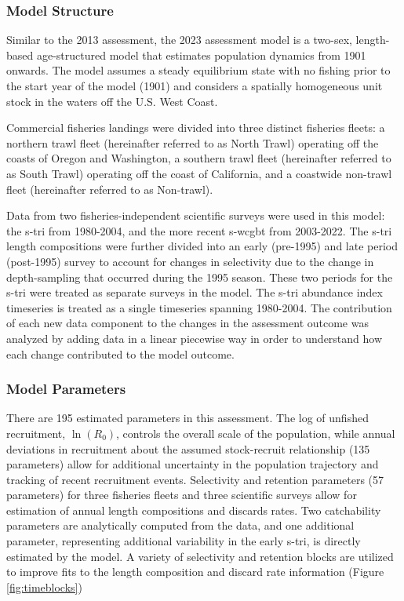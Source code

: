 \documentclass[11pt,
  english,
  letterpaper,
]{article}
\begin{document}
\hypertarget{model-structure}{%
\subsubsection{Model Structure}\label{model-structure}}

Similar to the 2013 assessment, the 2023 assessment model is a two-sex, length-based age-structured model that estimates population dynamics from 1901 onwards. The model assumes a steady equilibrium state with no fishing prior to the start year of the model (1901) and considers a spatially homogeneous unit stock in the waters off the U.S. West Coast.

Commercial fisheries landings were divided into three distinct fisheries fleets: a northern trawl fleet (hereinafter referred to as North Trawl) operating off the coasts of Oregon and Washington, a southern trawl fleet (hereinafter referred to as South Trawl) operating off the coast of California, and a coastwide non-trawl fleet (hereinafter referred to as Non-trawl).

Data from two fisheries-independent scientific surveys were used in this model: the \gls{s-tri} from 1980-2004, and the more recent \gls{s-wcgbt} from 2003-2022. The \gls{s-tri} length compositions were further divided into an early (pre-1995) and late period (post-1995) survey to account for changes in selectivity due to the change in depth-sampling that occurred during the 1995 season. These two periods for the \gls{s-tri} were treated as separate surveys in the model. The \gls{s-tri} abundance index timeseries is treated as a single timeseries spanning 1980-2004. The contribution of each new data component to the changes in the assessment outcome was analyzed by adding data in a linear piecewise way in order to understand how each change contributed to the model outcome.

\hypertarget{model-parameters}{%
\subsubsection{Model Parameters}\label{model-parameters}}

There are 195 estimated parameters in this assessment. The log of unfished recruitment, \(\ln(R_0)\), controls the overall scale of the population, while annual deviations in recruitment about the assumed stock-recruit relationship (135 parameters) allow for additional uncertainty in the population trajectory and tracking of recent recruitment events. Selectivity and retention parameters (57 parameters) for three fisheries fleets and three scientific surveys allow for estimation of annual length compositions and discards rates. Two catchability parameters are analytically computed from the data, and one additional parameter, representing additional variability in the early \gls{s-tri}, is directly estimated by the model. A variety of selectivity and retention blocks are utilized to improve fits to the length composition and discard rate information (Figure \ref{fig:timeblocks})
\end{document}
